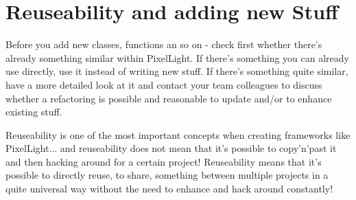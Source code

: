 \section{Reuseability and adding new Stuff}
Before you add new classes, functions an so on - check first whether there's already something similar within PixelLight. If there's something you can already use directly, use it instead of writing new stuff. If there's something quite similar, have a more detailed look at it and contact your team colleagues to discuss whether a refactoring is possible and reasonable to update and/or to enhance existing stuff.

Reuseability is one of the most important concepts when creating frameworks like PixelLight... and reuseability does not mean that it's possible to copy'n'past it and then hacking around for a certain project! Reuseability means that it's possible to directly reuse, to share, something between multiple projects in a quite universal way without the need to enhance and hack around constantly!
